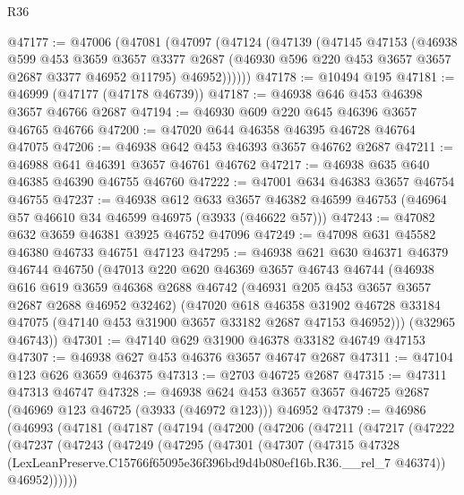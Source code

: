 \begin{lexlean}{R36}
\begin{coremodule}
@47177 := @47006
    (@47081
      (@47097
        (@47124
          (@47139
            (@47145
              @47153
              (@46938
                @599
                @453
                @3659
                @3657
                @3377
                @2687
                (@46930 @596 @220 @453 @3657 @3657 @2687 @3377 @46952 @11795)
                @46952))))))
@47178 := @10494 @195
@47181 := @46999 (@47177 (@47178 @46739))
@47187 := @46938 @646 @453 @46398 @3657 @46766 @2687
@47194 := @46930 @609 @220 @645 @46396 @3657 @46765 @46766
@47200 := @47020 @644 @46358 @46395 @46728 @46764 @47075
@47206 := @46938 @642 @453 @46393 @3657 @46762 @2687
@47211 := @46988 @641 @46391 @3657 @46761 @46762
@47217 := @46938 @635 @640 @46385 @46390 @46755 @46760
@47222 := @47001 @634 @46383 @3657 @46754 @46755
@47237 := @46938
    @612
    @633
    @3657
    @46382
    @46599
    @46753
    (@46964 @57 @46610 @34 @46599 @46975 (@3933 (@46622 @57)))
@47243 := @47082 @632 @3659 @46381 @3925 @46752 @47096
@47249 := @47098 @631 @45582 @46380 @46733 @46751 @47123
@47295 := @46938
    @621
    @630
    @46371
    @46379
    @46744
    @46750
    (@47013
      @220
      @620
      @46369
      @3657
      @46743
      @46744
      (@46938
        @616
        @619
        @3659
        @46368
        @2688
        @46742
        (@46931 @205 @453 @3657 @3657 @2687 @2688 @46952 @32462)
        (@47020
          @618
          @46358
          @31902
          @46728
          @33184
          @47075
          (@47140 @453 @31900 @3657 @33182 @2687 @47153 @46952)))
      (@32965 @46743))
@47301 := @47140 @629 @31900 @46378 @33182 @46749 @47153
@47307 := @46938 @627 @453 @46376 @3657 @46747 @2687
@47311 := @47104 @123 @626 @3659 @46375
@47313 := @2703 @46725 @2687
@47315 := @47311 @47313 @46747
@47328 := @46938
    @624
    @453
    @3657
    @3657
    @46725
    @2687
    (@46969 @123 @46725 (@3933 (@46972 @123)))
    @46952
@47379 := @46986
    (@46993
      (@47181
        (@47187
          (@47194
            (@47200
              (@47206
                (@47211
                  (@47217
                    (@47222
                      (@47237
                        (@47243
                          (@47249
                            (@47295
                              (@47301
                                (@47307
                                  (@47315
                                    @47328
                                    (LexLeanPreserve.C15766f65095e36f396bd9d4b080ef16b.R36.__rel_7
                                      @46374))
                                  @46952))))))

\end{coremodule}
\end{lexlean}
